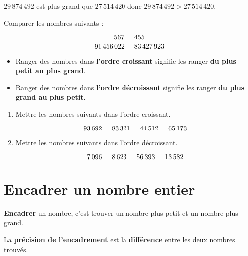 \documentclass[a4paper,dvipsnames]{article}
\begin{document}
\begin{Ex}
$29\,874\,492$ est plus grand que $27\,514\,420$ donc $29\,874\,492>27\,514\,420$.
\end{Ex}

\begin{ExOApp}[]
Comparer les nombres suivants :

\[567 \hspace{.5cm} 455\]
\[91\,456\,022 \hspace{.5cm} 83\,427\,923\]
\end{ExOApp} 

\begin{Def}
\begin{itemize}
\item Ranger des nombres dans \textbf{l'ordre croissant} signifie les ranger \textbf{du plus petit au plus grand}.
\item Ranger des nombres dans \textbf{l'ordre décroissant} signifie les ranger \textbf{du plus grand au plus petit}.
\end{itemize}
\end{Def}

\begin{ExOApp}[]
\begin{enumerate}
\item Mettre les nombres suivants dans l'ordre croissant.

\[93\,692 \hspace{.5cm} 83\,321 \hspace{.5cm} 44\,512 \hspace{.5cm} 65\,173\]
\item Mettre les nombres suivants dans l'ordre décroissant.

\[7\,096 \hspace{.5cm} 8\,623 \hspace{.5cm} 56\,393 \hspace{.5cm} 13\,582\]
\end{enumerate}
\end{ExOApp}

\section{Encadrer un nombre entier}

\begin{Def}
\textbf{Encadrer} un nombre, c'est trouver un nombre plus petit et un nombre plus grand.

La \textbf{précision de l'encadrement} est la \textbf{différence} entre les deux nombres trouvés.
\end{Def}
\end{document}
